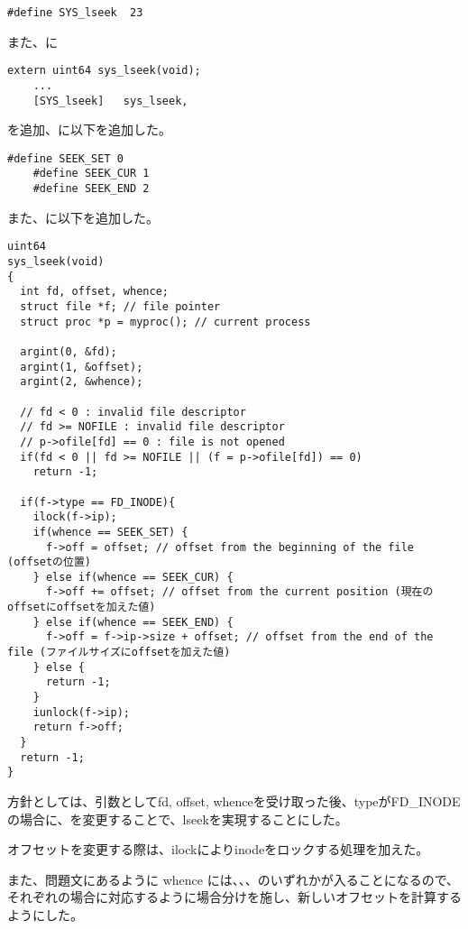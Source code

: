 \documentclass[platex,dvipdfmx, titlepage]{jlreq} %
\begin{document}
\begin{lstlisting}[caption={kernel/sysycall.h}]
    #define SYS_lseek  23
\end{lstlisting}

\noindent また、に

\begin{lstlisting}[caption={kernel/sysycall.c}]
    extern uint64 sys_lseek(void);
    ...
    [SYS_lseek]   sys_lseek,
\end{lstlisting}
\noindent を追加、に以下を追加した。

\begin{lstlisting}[caption={kernel/fcntl.h}]
    #define SEEK_SET 0
    #define SEEK_CUR 1
    #define SEEK_END 2
\end{lstlisting}

\noindent また、に以下を追加した。

\begin{lstlisting}[caption={kernel/sysfile.c}]
uint64
sys_lseek(void)
{
  int fd, offset, whence;
  struct file *f; // file pointer
  struct proc *p = myproc(); // current process
  
  argint(0, &fd);
  argint(1, &offset);
  argint(2, &whence);
  
  // fd < 0 : invalid file descriptor
  // fd >= NOFILE : invalid file descriptor
  // p->ofile[fd] == 0 : file is not opened 
  if(fd < 0 || fd >= NOFILE || (f = p->ofile[fd]) == 0)
    return -1;

  if(f->type == FD_INODE){
    ilock(f->ip);
    if(whence == SEEK_SET) {
      f->off = offset; // offset from the beginning of the file (offsetの位置)
    } else if(whence == SEEK_CUR) {
      f->off += offset; // offset from the current position (現在のoffsetにoffsetを加えた値)
    } else if(whence == SEEK_END) {
      f->off = f->ip->size + offset; // offset from the end of the file (ファイルサイズにoffsetを加えた値)
    } else {
      return -1;
    }
    iunlock(f->ip);
    return f->off;
  }
  return -1;
}
\end{lstlisting}

方針としては、引数としてfd, offset, whenceを受け取った後、typeがFD\_INODEの場合に、を変更することで、lseekを実現することにした。

オフセットを変更する際は、ilockによりinodeをロックする処理を加えた。

また、問題文にあるように whence には、、、のいずれかが入ることになるので、それぞれの場合に対応するように場合分けを施し、新しいオフセットを計算するようにした。
\end{document}
